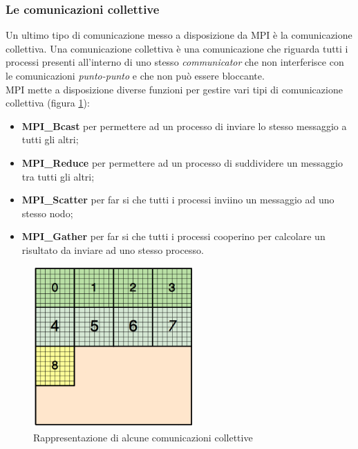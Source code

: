 \subsubsection{Le comunicazioni collettive}\label{subsubsec:coll_comm}
Un ultimo tipo di comunicazione messo a disposizione da MPI è la comunicazione collettiva. Una comunicazione collettiva è una comunicazione che riguarda tutti i processi presenti all'interno di uno stesso \textit{communicator} che non interferisce con le comunicazioni \emph{punto-punto} e che non può essere bloccante.\\
MPI mette a disposizione diverse funzioni per gestire vari tipi di comunicazione collettiva (figura \ref{fig:mpi_collect_comm}):
\begin{itemize}
\item \textbf{MPI\_Bcast} per permettere ad un processo di inviare lo stesso messaggio a tutti gli altri;
\item \textbf{MPI\_Reduce} per permettere ad un processo di suddividere un messaggio tra tutti gli altri;
\item \textbf{MPI\_Scatter} per far si che tutti i processi inviino un messaggio ad uno stesso nodo;
\item \textbf{MPI\_Gather} per far si che tutti i processi cooperino per calcolare un risultato da inviare ad uno stesso processo.
\end{itemize}
\begin{figure}[H]
\centering
\includegraphics[width=0.55\textwidth]{immagini/block_on_grid.png}
\caption{Rappresentazione di alcune comunicazioni collettive}
\label{fig:mpi_collect_comm}
\end{figure}

